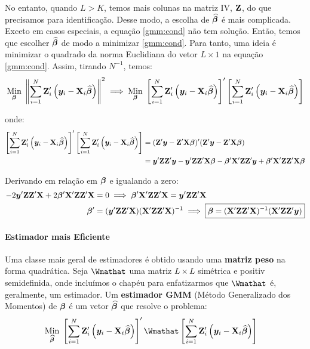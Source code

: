\documentclass[11pt, oneside, a4paper, article]{article}
\numberwithin{equation}{section}
\begin{document}
\begin{description}
\vspace{1 em}
\noindent
No entanto, quando $L > K$, temos mais colunas na matriz IV, $\mathbf{Z}$, do que precisamos para identificação.
Desse modo, a escolha de $\widehat{\boldsymbol{\beta}}$ é mais complicada.
Exceto em casos especiais, a equação \eqref{gmm:cond} não tem solução.
Então, temos que escolher $\widehat{\boldsymbol{\beta}}$ de modo a minimizar \eqref{gmm:cond}.
Para tanto, uma ideia é minimizar o quadrado da norma Euclidiana do vetor $L \times 1$ na equação \eqref{gmm:cond}.
Assim, tirando $N^{-1}$, temos:
\begin{align*}
\underset{\boldsymbol{\beta}}{\text{Min}} \;
\left\| \sum_{i=1}^{N} \mathbf{Z}_{i}' \left( \boldsymbol{y}_{i} - \mathbf{X}_{i} \widehat{\boldsymbol{\beta}} \right) \right\|^2
\implies 
\underset{\boldsymbol{\beta}}{\text{Min}} \;
\left[ \sum_{i=1}^{N} \mathbf{Z}_{i}' \left( \boldsymbol{y}_{i} - \mathbf{X}_{i} \widehat{\boldsymbol{\beta}} \right) \right]'
\left[ \sum_{i=1}^{N} \mathbf{Z}_{i}' \left( \boldsymbol{y}_{i} - \mathbf{X}_{i} \widehat{\boldsymbol{\beta}} \right) \right]
\end{align*}

\noindent
onde:
\begin{align*}
\left[ \sum_{i=1}^{N} \mathbf{Z}_{i}' \left( \boldsymbol{y}_{i} - \mathbf{X}_{i} \widehat{\boldsymbol{\beta}} \right) \right]'
\left[ \sum_{i=1}^{N} \mathbf{Z}_{i}' \left( \boldsymbol{y}_{i} - \mathbf{X}_{i} \widehat{\boldsymbol{\beta}} \right) \right]
&=
( \mathbf{Z}' \boldsymbol{y} - \mathbf{Z}' \mathbf{X} \boldsymbol{\beta} )' ( \mathbf{Z}' \boldsymbol{y} - \mathbf{Z}' \mathbf{X} \boldsymbol{\beta} )
\\ &=
\boldsymbol{y}' \mathbf{Z}\mathbf{Z}' \boldsymbol{y} -
\boldsymbol{y}' \mathbf{Z}\mathbf{Z}' \mathbf{X} \boldsymbol{\beta} -
\boldsymbol{\beta}' \mathbf{X}' \mathbf{Z}\mathbf{Z}' \boldsymbol{y} +
\boldsymbol{\beta}' \mathbf{X}' \mathbf{Z}\mathbf{Z}' \mathbf{X} \boldsymbol{\beta}
\end{align*}

Derivando em relação em $\boldsymbol{\beta}$ e igualando a zero:
\begin{align*}
-2 \boldsymbol{y}' \mathbf{Z}\mathbf{Z}' \mathbf{X} + 2 \boldsymbol{\beta}'\mathbf{X}' \mathbf{Z}\mathbf{Z}' \mathbf{X} &= 0
\implies
\boldsymbol{\beta}'\mathbf{X}' \mathbf{Z}\mathbf{Z}' \mathbf{X} = \boldsymbol{y}' \mathbf{Z}\mathbf{Z}' \mathbf{X} 
\\
\boldsymbol{\beta}' &= ( \boldsymbol{y}' \mathbf{Z}\mathbf{Z}' \mathbf{X} ) ( \mathbf{X}' \mathbf{Z}\mathbf{Z}' \mathbf{X} )^{-1}
\implies
\boxed{\boldsymbol{\beta} = ( \mathbf{X}' \mathbf{Z}\mathbf{Z}' \mathbf{X} )^{-1} ( \mathbf{X}' \mathbf{Z}\mathbf{Z}' \boldsymbol{y} ) }
\end{align*}

\paragraph{Estimador mais Eficiente}

Uma classe mais geral de estimadores é obtido usando uma \textbf{matriz peso} na forma quadrática.
Seja $\Wmathat$ uma matriz $L \times L$ simétrica e positiv semidefinida, onde incluímos o chapéu para enfatizarmos que $\Wmathat$ é, geralmente, um estimador.
Um \textbf{estimador GMM} (Método Generalizado dos Momentos) de $\boldsymbol{\beta}$ é um vetor $\widehat{\boldsymbol{\beta}}$ que resolve o problema:
\begin{align*}
\underset{\betavechat}{\text{Min}} \; &
\left[\sum_{i=1}^{N} \Zmat_{i}' \left( \yvec_{i} - \Xmat_{i} \betavechat \right) \right]'
\Wmathat
\left[\sum_{i=1}^{N} \Zmat_{i}' \left( \yvec_{i} - \Xmat_{i} \betavechat \right) \right]
\end{align*}


\end{description}
\end{document}
